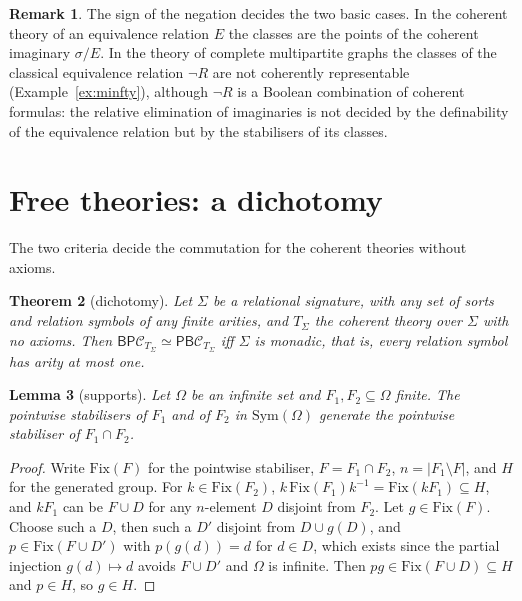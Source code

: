 \documentclass[11pt]{amsart}
\newtheorem{thm}{Theorem}[section]
\newtheorem{lem}[thm]{Lemma}
\theoremstyle{definition}
\newtheorem{rem}[thm]{Remark}
\newcommand{\PP}{\mathsf P}
\newcommand{\BB}{\mathsf B}
\newcommand{\cC}{\mathcal C}
\begin{document}
\begin{rem}
The sign of the negation decides the two basic cases. In the coherent
theory of an equivalence relation $E$ the classes are the points of the
coherent imaginary $\sigma/E$. In the theory of complete multipartite
graphs the classes of the classical equivalence relation $\neg R$ are
not coherently representable (Example~\ref{ex:minfty}), although $\neg
R$ is a Boolean combination of coherent formulas: the relative
elimination of imaginaries is not decided by the definability of the
equivalence relation but by the stabilisers of its classes.
\end{rem}

\section{Free theories: a dichotomy}\label{sec:free}

The two criteria decide the commutation for the coherent theories
without axioms.

\begin{thm}[dichotomy]\label{thm:free}
Let $\Sigma$ be a relational signature, with any set of sorts and
relation symbols of any finite arities, and $T_\Sigma$ the coherent theory over
$\Sigma$ with no axioms. Then $\BB\PP\cC_{T_\Sigma}\simeq\PP\BB\cC_{T_\Sigma}$
iff $\Sigma$ is monadic, that is, every relation symbol has arity at
most one.
\end{thm}

\begin{lem}[supports]\label{lem:support}
Let $\Omega$ be an infinite set and $F_1,F_2\subseteq\Omega$ finite. The
pointwise stabilisers of $F_1$ and of $F_2$ in $\mathrm{Sym}(\Omega)$
generate the pointwise stabiliser of $F_1\cap F_2$.
\end{lem}
\begin{proof}
Write $\mathrm{Fix}(F)$ for the pointwise stabiliser, $F=F_1\cap F_2$,
$n=|F_1\setminus F|$, and $H$ for the generated group. For
$k\in\mathrm{Fix}(F_2)$, $k\,\mathrm{Fix}(F_1)k^{-1}=\mathrm{Fix}(kF_1)
\subseteq H$, and $kF_1$ can be $F\cup D$ for any $n$-element $D$
disjoint from $F_2$. Let $g\in\mathrm{Fix}(F)$. Choose such a $D$, then
such a $D'$ disjoint from $D\cup g(D)$, and $p\in\mathrm{Fix}(F\cup D')$
with $p(g(d))=d$ for $d\in D$, which exists since the partial injection
$g(d)\mapsto d$ avoids $F\cup D'$ and $\Omega$ is infinite. Then
$pg\in\mathrm{Fix}(F\cup D)\subseteq H$ and $p\in H$, so $g\in H$.
\end{proof}
\end{document}

